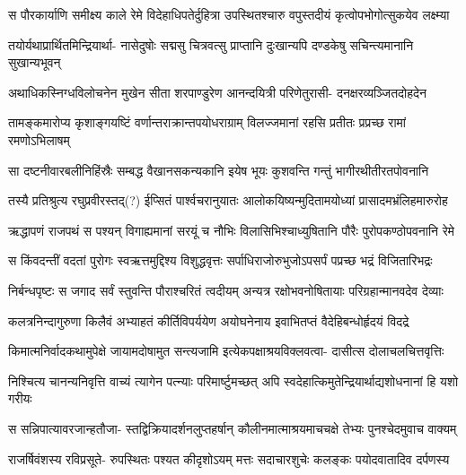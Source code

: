 \fourlineindentedshloka
{स पौरकार्याणि समीक्ष्य काले}
{रेमे विदेहाधिपतेर्दुहित्रा}
{उपस्थितश्चारु वपुस्तदीयं}
{कृत्वोपभोगोत्सुकयेव लक्ष्म्या} %

\fourlineindentedshloka
{तयोर्यथाप्रार्थितमिन्द्रियार्था-}
{नासेदुषोः सद्मसु चित्रवत्सु}
{प्राप्तानि दुःखान्यपि दण्डकेषु}
{सचिन्त्यमानानि सुखान्यभूवन्} %

\fourlineindentedshloka
{अथाधिकस्निग्धविलोचनेन}
{मुखेन सीता शरपाण्डुरेण}
{आनन्दयित्री परिणेतुरासी-}
{दनक्षरव्यञ्जितदोहदेन} %

\fourlineindentedshloka
{तामङ्कमारोप्य कृशाङ्गयष्टिं}
{वर्णान्तराक्रान्तपयोधराग्राम्}
{विलज्जमानां रहसि प्रतीतः}
{प्रप्रच्छ रामां रमणोऽभिलाषम्} %

\fourlineindentedshloka
{सा दष्टनीवारबलीनिहिंस्रैः}
{सम्बद्ध वैखानसकन्यकानि}
{इयेष भूयः कुशवन्ति गन्तुं}
{भागीरथीतीरतपोवनानि} %

\twolineshloka
{तस्यै प्रतिश्रुत्य रघुप्रवीरस्तद्(?) ईप्सितं पार्श्वचरानुयातः}
{आलोकयिष्यन्मुदितामयोध्यां प्रासादमभ्रंलिहमारुरोह} %

\fourlineindentedshloka
{ऋद्धापणं राजपथं स पश्यन्}
{विगाह्यमानां सरयूं च नौभिः}
{विलासिभिश्चाध्युषितानि पौरैः}
{पुरोपकण्ठोपवनानि रेमे} %

\fourlineindentedshloka
{स किंवदन्तीं वदतां पुरोगः}
{स्वऋत्तमुद्दिश्य विशुद्धवृत्तः}
{सर्पाधिराजोरुभुजोऽपसर्पं}
{पप्रच्छ भद्रं विजितारिभद्रः} %

\fourlineindentedshloka
{निर्बन्धपृष्टः स जगाद सर्वं}
{स्तुवन्ति पौराश्चरितं त्वदीयम्}
{अन्यत्र रक्षोभवनोषितायाः}
{परिग्रहान्मानवदेव देव्याः} %

\fourlineindentedshloka
{कलत्रनिन्दागुरुणा किलैवं}
{अभ्याहतं कीर्तिविपर्ययेण}
{अयोघनेनाय इवाभितप्तं}
{वैदेहिबन्धोर्हृदयं विदद्रे} %

\fourlineindentedshloka
{किमात्मनिर्वादकथामुपेक्षे}
{जायामदोषामुत सन्त्यजामि}
{इत्येकपक्षाश्रयविक्लवत्वा-}
{दासीत्स दोलाचलचित्तवृत्तिः} %

\twolineshloka
{निश्चित्य चानन्यनिवृत्ति वाच्यं त्यागेन पत्न्याः परिमार्ष्टुमच्छत्}
{अपि स्वदेहात्किमुतेन्द्रियार्थाद्यशोधनानां हि यशो गरीयः} %

\fourlineindentedshloka
{स सन्निपात्यावरजान्हतौजा-}
{स्तद्विक्रियादर्शनलुप्तहर्षान्}
{कौलीनमात्माश्रयमाचचक्षे}
{तेभ्यः पुनश्चेदमुवाच वाक्यम्} %

\fourlineindentedshloka
{राजर्षिवंशस्य रविप्रसूते-}
{रुपस्थितः पश्यत कीदृशोऽयम्}
{मत्तः सदाचारशुचेः कलङ्कः}
{पयोदवातादिव दर्पणस्य} %

